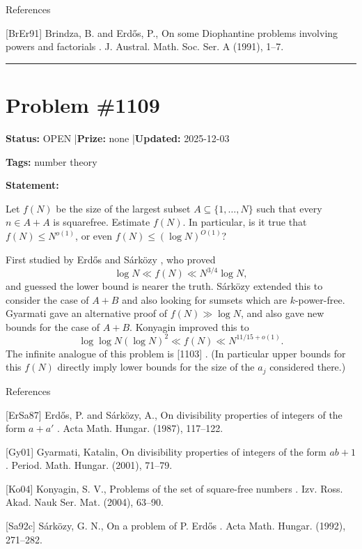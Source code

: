\documentclass{article}
\begin{document}
References

[BrEr91] Brindza, B. and Erd\H{o}s, P., On some {D}iophantine problems involving powers and factorials . J. Austral. Math. Soc. Ser. A (1991), 1--7.

\noindent\rule{\linewidth}{0.4pt}


\section{Problem \#1109}
\label{prob:1109}

\noindent\textbf{Status:} OPEN \quad|\quad \textbf{Prize:} none \quad|\quad \textbf{Updated:} 2025-12-03

\noindent\textbf{Tags:} number theory

\medskip

\noindent\textbf{Statement:}

Let $f(N)$ be the size of the largest subset $A\subseteq \{1,\ldots,N\}$ such that every $n\in A+A$ is squarefree. Estimate $f(N)$. In particular, is it true that $f(N)\leq N^{o(1)}$, or even $f(N) \leq (\log N)^{O(1)}$?




First studied by Erd\H{o}s and S\'{a}rk\"{o}zy \cite{ErSa87}, who proved\[\log N \ll f(N) \ll N^{3/4}\log N,\]and guessed the lower bound is nearer the truth. S\'{a}rk\"{o}zy \cite{Sa92c} extended this to consider the case of $A+B$ and also looking for sumsets which are $k$-power-free. Gyarmati \cite{Gy01} gave an alternative proof of $f(N)\gg \log N$, and also gave new bounds for the case of $A+B$. Konyagin \cite{Ko04} improved this to\[ \log\log N(\log N)^2\ll f(N) \ll N^{11/15+o(1)}.\]The infinite analogue of this problem is [1103] . (In particular upper bounds for this $f(N)$ directly imply lower bounds for the size of the $a_j$ considered there.)




References

[ErSa87] Erd\H{o}s, P. and S\'{a}rk\"ozy, A., On divisibility properties of integers of the form {$a+a'$} . Acta Math. Hungar. (1987), 117--122.

[Gy01] Gyarmati, Katalin, On divisibility properties of integers of the form {$ab+1$} . Period. Math. Hungar. (2001), 71--79.

[Ko04] Konyagin, S. V., Problems of the set of square-free numbers . Izv. Ross. Akad. Nauk Ser. Mat. (2004), 63--90.

[Sa92c] S\'{a}rk\"ozy, G. N., On a problem of {P}. {E}rd\H{o}s . Acta Math. Hungar. (1992), 271--282.
\end{document}
